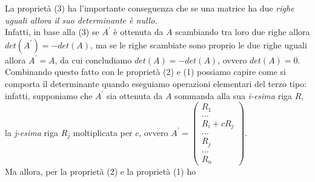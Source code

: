\documentclass{book}
\begin{document}
\clearpage              
La proprietà (3) ha l'importante conseguenza che se una matrice ha due {\it righe uguali allora
  il suo determinante è nullo.}\\
Infatti, in base alla (3) se $A^\prime$ è ottenuta da $A$ scambiando tra loro due righe allora
$det(A^\prime)=-det(A)$, ma se le righe scambiate sono proprio le due righe uguali allora
$A^\prime=A$, da cui concludiamo $det(A)=-det(A)$, ovvero $det(A)=0$. Combinando questo fatto
con le proprietà (2) e (1) possiamo capire come si comporta il determinante quando eseguiamo
operazioni elementari del terzo tipo: infatti, supponiamo che $A^\prime$ sia ottenuta da $A$
sommanda alla sua {\it i-esima} riga $R$, la {\it j-esima} riga $R_j$ moltiplicata per $c$,
ovvero $A^\prime =\begin{pmatrix}
R_1\\
\dots\\
R_i +cR_j\\
\dots\\
R_j\\
\dots\\
R_n
\end{pmatrix}
$.\\
Ma allora, per la proprietà (2) e la proprietà (1) ho
\end{document}
